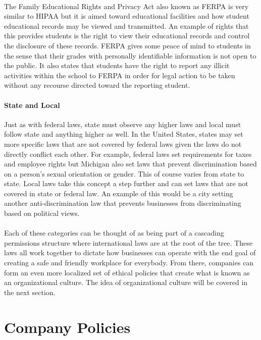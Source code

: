 \documentclass[a4paper,12pt]{article}
\begin{document}
\paragraph{}The Family Educational Rights and Privacy Act also known as FERPA is very similar to HIPAA but it is aimed toward educational facilities and how student educational records may be viewed and transmitted. An example of rights that this provides students is the right to view their educational records and control the disclosure of these records. FERPA gives some peace of mind to students in the sense that their grades with personally identifiable information is not open to the public. It also states that students have the right to report any illicit activities within the school to FERPA in order for legal action to be taken without any recourse directed toward the reporting student.
\paragraph{State and Local}Just as with federal laws, state must observe any higher laws and local must follow state and anything higher as well. In the United States, states may set more specific laws that are not covered by federal laws given the laws do not directly conflict each other. For example, federal laws set requirements for taxes and employee rights but Michigan also set laws that prevent discrimination based on a person's sexual orientation or gender. This of course varies from state to state. Local laws take this concept a step further and can set laws that are not covered in state or federal law. An example of this would be a city setting another anti-discrimination law that prevents businesses from discriminating based on political views.
\paragraph{}Each of these categories can be thought of as being part of a cascading permissions structure where international laws are at the root of the tree. These laws all work together to dictate how businesses can operate with the end goal of creating a safe and friendly workplace for everybody. From there, companies can form an even more localized set of ethical policies that create what is known as an organizational culture. The idea of organizational culture will be covered in the next section.

\section*{Company Policies}
\end{document}
